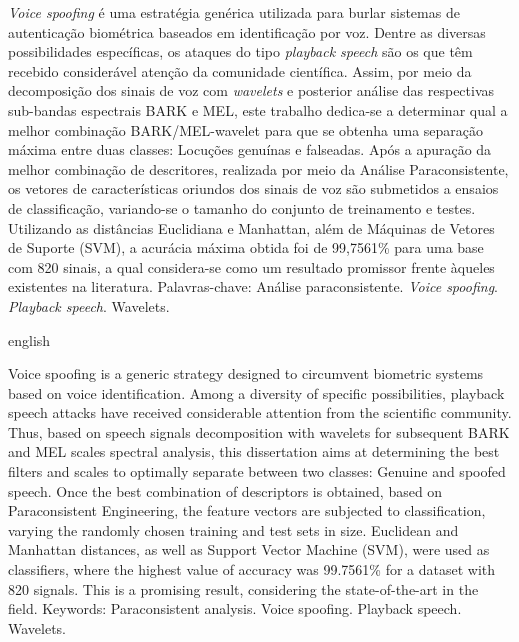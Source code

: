 \begin{resumo}
	\par \textit{Voice spoofing} é uma estratégia genérica utilizada para burlar sistemas de autenticação biométrica baseados em identificação por voz. Dentre as diversas possibilidades específicas, os ataques do tipo \textit{playback speech} são os que têm recebido considerável atenção da comunidade científica. Assim, por meio da decomposição dos sinais de voz com \textit{wavelets} e posterior análise das respectivas sub-bandas espectrais BARK e MEL, este trabalho dedica-se a determinar qual a melhor combinação BARK/MEL-wavelet para que se obtenha uma separação máxima entre duas classes: Locuções genuínas e falseadas. Após a apuração da melhor combinação de descritores, realizada por meio da Análise Paraconsistente, os vetores de características oriundos dos sinais de voz são submetidos a ensaios de classificação, variando-se o tamanho do conjunto de treinamento e testes. Utilizando as distâncias Euclidiana e Manhattan, além de Máquinas de Vetores de Suporte (SVM), a acurácia máxima obtida foi de 99,7561\% para uma base com 820 sinais, a qual considera-se como um resultado promissor frente àqueles existentes na literatura.\newline\newline
	Palavras-chave: Análise paraconsistente. \textit{Voice spoofing}. \textit{Playback speech}. Wavelets.
\end{resumo}

\begin{resumo}[Abstract]
	\begin{otherlanguage*}{english}
		\par Voice spoofing is a generic strategy designed to circumvent biometric systems based on voice identification. Among a diversity of specific possibilities, playback speech attacks have received considerable attention from the scientific community. Thus, based on speech signals decomposition with wavelets for subsequent BARK and MEL scales spectral analysis, this dissertation aims at determining the best filters and scales to optimally separate between two classes: Genuine and spoofed speech. Once the best combination of descriptors is obtained, based on Paraconsistent Engineering, the feature vectors are subjected to classification, varying the randomly chosen training and test sets in size. Euclidean and Manhattan distances, as well as Support Vector Machine (SVM), were used as classifiers, where the highest value of accuracy was 99.7561\% for a dataset with 820 signals. This is a promising result, considering the state-of-the-art in the field. \newline\newline
		Keywords: Paraconsistent analysis. Voice spoofing. Playback speech. Wavelets.
	\end{otherlanguage*}
\end{resumo}
